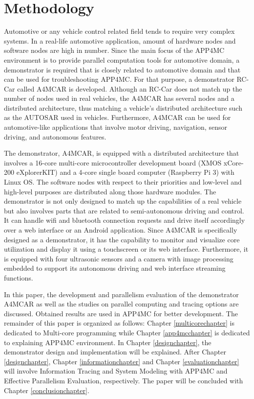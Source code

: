 \section{Methodology}

Automotive or any vehicle control related field tends to require very complex systems. In a real-life automotive application, amount of hardware nodes and software nodes are high in number. Since the main focus of the APP4MC environment is to provide parallel computation tools for automotive domain, a demonstrator is required that is closely related to automotive domain and that can be used for troubleshooting APP4MC. For that purpose, a demonstrator RC-Car called A4MCAR is developed. Although an RC-Car does not match up the number of nodes used in real vehicles, the A4MCAR has several nodes and a distributed architecture, thus matching a vehicle's distributed architecture such as the AUTOSAR used in vehicles. Furthermore, A4MCAR can be used for automotive-like applications that involve motor driving, navigation, sensor driving, and autonomous features.

The demonstrator, A4MCAR, is equipped with a distributed architecture that involves a 16-core multi-core microcontroller development board (XMOS xCore-200 eXplorerKIT) and a 4-core single board computer (Raspberry Pi 3) with Linux OS. The software nodes with respect to their priorities and low-level and high-level purposes are distributed along those hardware modules. The demonstrator is not only designed to match up the capabilities of a real vehicle but also involves parts that are related to semi-autonomous driving and control. It can handle wifi and bluetooth connection requests and drive itself accordingly over a web interface or an Android application. Since A4MCAR is specifically designed as a demonstrator, it has the capability to monitor and visualize core utilization and display it using a touchscreen or its web interface. Furthermore, it is equipped with four ultrasonic sensors and a camera with image processing embedded to support its autonomous driving and web interface streaming functions.

In this paper, the development and parallelism evaluation of the demonstrator A4MCAR as well as the studies on parallel computing and tracing options are discussed. Obtained results are used in APP4MC for better development. The remainder of this paper is organized as follows: Chapter \ref{multicorechapter} is dedicated to Multi-core programming while Chapter \ref{app4mcchapter} is dedicated to explaining APP4MC environment. In Chapter \ref{designchapter}, the demonstrator design and implementation will be explained. After Chapter \ref{designchapter}, Chapter \ref{informationchapter} and Chapter \ref{evaluationchapter} will involve Information Tracing and System Modeling with APP4MC and Effective Parallelism Evaluation, respectively. The paper will be concluded with Chapter \ref{conclusionchapter}.

